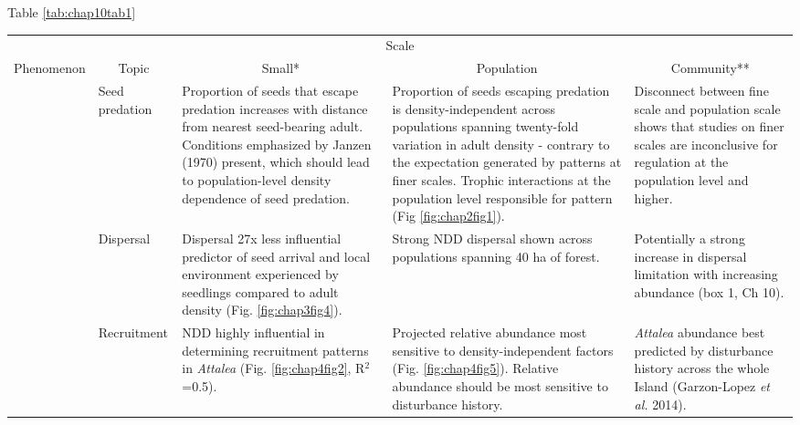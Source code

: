 \documentclass[b5paper,justified]{tufte-book} %
\begin{document}
\begin{landscape}
\begin{table}
\begin{center}

\hspace*{4cm}\begin{minipage}{20cm}
 \begin{center}
 Table \ref{tab:chap10tab1}
\end{center}  
\end{minipage}
\footnotesize
\hspace*{4cm}\begin{tabular}{p{1cm} p{2.5cm} p{5cm} p{5cm} p{5cm}}
\hline
\multicolumn{5}{c}{Scale} \\
\multicolumn{1}{c}{Phenomenon} & \multicolumn{1}{c}{Topic} & \multicolumn{1}{c}{Small*} & \multicolumn{1}{c}{Population} &  \multicolumn{1}{c}{Community**} \\
 \hline
 \parbox[t]{3mm}{} & 
 Seed predation	
 & Proportion of seeds that escape predation increases with distance from nearest seed-bearing adult. Conditions emphasized by Janzen (1970) present, which should lead to population-level density dependence of seed predation.  
 &  Proportion of seeds escaping predation is density-independent across populations spanning twenty-fold variation in adult density - contrary to the expectation generated by patterns at finer scales. Trophic interactions at the population level responsible for pattern (Fig \ref{fig:chap2fig1}). \vspace{0.2cm}  
& Disconnect between fine scale and population scale shows that studies on finer scales are inconclusive for regulation at the population level and higher.  \\
 & Dispersal 	
 & Dispersal 27x less influential predictor of seed arrival and local environment experienced by seedlings compared to adult density (Fig. \ref{fig:chap3fig4}). \vspace{0.3cm}
 & Strong NDD dispersal shown across populations spanning 40 ha of forest. 	
 & Potentially a strong increase in dispersal limitation with increasing abundance (box 1, Ch 10).\\
 
 & Recruitment 	
 & NDD highly influential in determining recruitment patterns in \textit{Attalea} (Fig. \ref{fig:chap4fig2}, R$^2$=0.5).	
 & Projected relative abundance most sensitive to density-independent factors (Fig. \ref{fig:chap4fig5}). Relative abundance should be most sensitive to disturbance history.\vspace{0.3cm}	
 & \textit{Attalea} abundance best predicted by disturbance history across the whole Island (Garzon-Lopez \textit{et al.} 2014). \\
 

\end{tabular}
\end{center}
\end{table}
\end{landscape}
\end{document}
